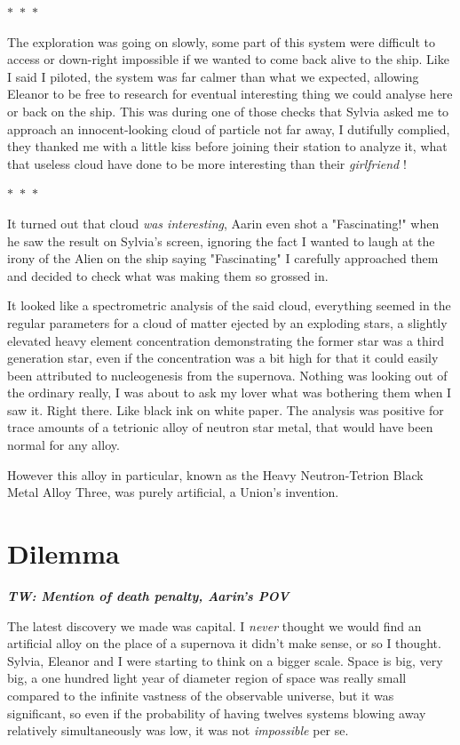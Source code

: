 \documentclass[colorlinks,12pt,a4paper]{book}
\newcommand\sep{\begin{center}
  \boldmath $\ast$~$\ast$~$\ast$
\end{center}}
\begin{document}
 \sep 
 
 The exploration was going on slowly, some part of this system were difficult to access or down-right impossible if we wanted 
 to come back alive to the ship. Like I said I piloted, the system was far calmer than what we expected, allowing Eleanor to be free to
 research for eventual interesting thing we could analyse here or back on the ship. This was during one of those checks that 
 Sylvia asked me to approach an innocent-looking cloud of particle not far away, I dutifully complied, they thanked me with a little 
 kiss before joining their station to analyze it, what that useless cloud have done to be more interesting than their \textit{girlfriend} !
 
 \sep 
 
 It turned out that cloud \textit{was interesting}, Aarin even shot a "Fascinating!" when he saw the result on Sylvia's screen,
 ignoring the fact I wanted to laugh at the irony of the Alien on the ship saying "Fascinating" I carefully approached them and decided
 to check what was making them so grossed in. \par 
 \bigskip
 
 It looked like a spectrometric analysis of the said cloud, everything seemed in 
 the regular parameters for a cloud of matter ejected by an exploding stars, a slightly elevated heavy element concentration demonstrating the 
 former star was a third generation star, even if the concentration was a bit high for that it could easily been attributed to 
 nucleogenesis from the supernova. Nothing was looking out of the ordinary really, I was about to ask my lover what was bothering them when 
 I saw it. Right there. Like black ink on white paper. The analysis was positive for trace amounts of a tetrionic alloy of neutron 
 star metal, that would have been normal for any alloy.\par 
 \bigskip
 
 However this alloy in particular, known as the Heavy Neutron-Tetrion Black Metal Alloy Three, was purely artificial, a Union's invention.
 
 
 \chapter{Dilemma}
 \textit{\textbf{TW: Mention of death penalty, Aarin's POV}}\par 
 \bigskip 
 
 The latest discovery we made was capital. I \textit{never} thought we would find an artificial alloy on the place of a supernova 
 it didn't make sense, or so I thought. Sylvia, Eleanor and I were starting to think on a bigger scale. Space is big, very big, 
 a one hundred light year of diameter region of space was really small compared to the infinite vastness of the observable universe, 
 but it was significant, so even if the probability of having twelves systems blowing away relatively simultaneously was low, it was 
 not \textit{impossible} per se.\par 
 \bigskip 
 
\end{document}
